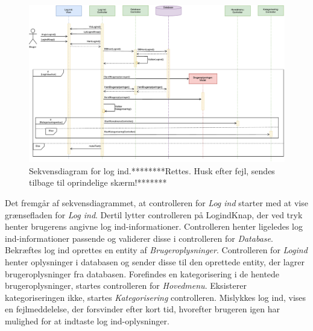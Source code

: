 \begin{figure} [H]
\centering
\includegraphics[width=1.55\textwidth, angle=90]{figures/Sek/SEKLogInd}
\caption{Sekvensdiagram for log ind.********Rettes. Husk efter fejl, sendes tilbage til oprindelige skærm!*******}
\label{fig:SEKlogind}
\end{figure}

\noindent
Det fremgår af sekvensdiagrammet, at controlleren for \textit{Log ind} starter med at vise grænsefladen for \textit{Log ind}. Dertil lytter controlleren på LogindKnap, der ved tryk henter brugerens angivne log ind-informationer. Controlleren henter ligeledes log ind-informationer passende og validerer disse i controlleren for \textit{Database}. Bekræftes log ind oprettes en entity af \textit{Brugeroplysninger}. Controlleren for \textit{Logind} henter oplysninger i databasen og sender disse til den oprettede entity, der lagrer brugeroplysninger fra databasen. Forefindes en kategorisering i de hentede brugeroplysninger, startes controlleren for \textit{Hovedmenu}. Eksisterer kategoriseringen ikke, startes \textit{Kategorisering} controlleren. Mislykkes log ind, vises en fejlmeddelelse, der forsvinder efter kort tid, hvorefter brugeren igen har mulighed for at indtaste log ind-oplysninger. 
